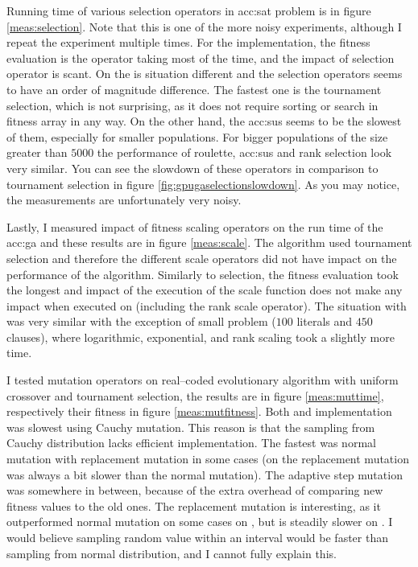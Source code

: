 Running time of various selection operators in \acrshort{acc:sat} problem is in figure \ref{meas:selection}. Note that this is one of the more noisy experiments, although I repeat the experiment multiple times. For the \cpu implementation, the fitness evaluation is the operator taking most of the time, and the impact of selection operator is scant. On the \gpu is situation different and the selection operators seems to have an order of magnitude difference. The fastest one is the tournament selection, which is not surprising, as it does not require sorting or search in fitness array in any way. On the other hand, the \acrshort{acc:sus} seems to be the slowest of them, especially for smaller populations. For bigger populations of the size greater than $5000$ the performance of roulette, \acrshort{acc:sus} and rank selection look very similar. You can see the slowdown of these operators in comparison to tournament selection in figure \ref{fig:gpugaselectionslowdown}. As you may notice, the measurements are unfortunately very noisy.

Lastly, I measured impact of fitness scaling operators on the run time of the \acrshort{acc:ga} and these results are in figure \ref{meas:scale}. The algorithm used tournament selection and therefore the different scale operators did not have impact on the performance of the algorithm. Similarly to selection, the fitness evaluation took the longest and impact of the execution of the scale function does not make any impact when executed on \cpu (including the rank scale operator). The situation with \gpu was very similar with the exception of small problem ($100$ literals and $450$ clauses), where logarithmic, exponential, and rank scaling took a slightly more time.

I tested mutation operators on real--coded evolutionary algorithm with uniform crossover and tournament selection, the results are in figure \ref{meas:muttime}, respectively their fitness in figure \ref{meas:mutfitness}. Both \cpu and \gpu implementation was slowest using Cauchy mutation. This reason is that the sampling from Cauchy distribution lacks efficient implementation. The fastest was normal mutation with replacement mutation in some \gpu cases (on \cpu the replacement mutation was always a bit slower than the normal mutation). The adaptive step mutation was somewhere in between, because of the extra overhead of comparing new fitness values to the old ones. The replacement mutation is interesting, as it outperformed normal mutation on some cases on \gpuns, but is steadily slower on \cpuns. I would believe sampling random value within an interval would be faster than sampling from normal distribution, and I cannot fully explain this.

